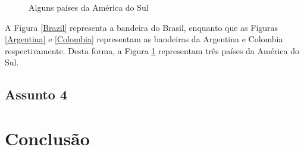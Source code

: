 \documentclass[12pt, a4paper, oneside]{book}
\begin{document}
\begin{figure}[h]
\centering
{}
\caption{Alguns países da América do Sul}\label{FigSouthAmerica}

\end{figure}

\vspace{1cm}

A Figura \ref{Brazil} representa a bandeira do Brasil, enquanto que as Figuras \ref{Argentina} e \ref{Colombia} representam as bandeiras da Argentina e Colombia respectivamente. Desta forma, a Figura \ref{FigSouthAmerica} representam três países da América do Sul.

\section{Assunto 4}

\chapter{Conclusão}
\end{document}
